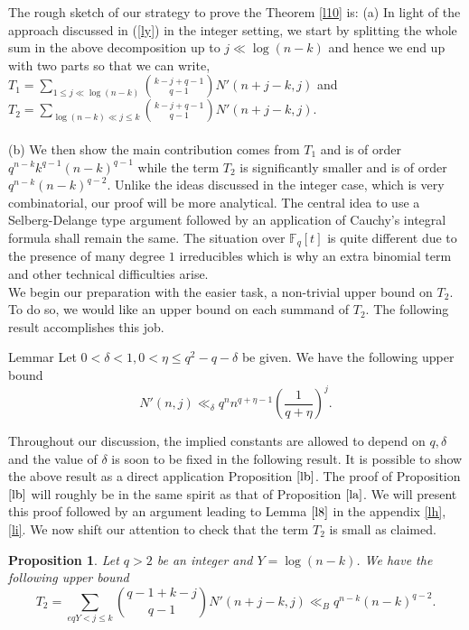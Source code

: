 \documentclass[12pt]{amsart}
\numberwithin{equation}{section}
\newtheorem{prop}[theorem]{Proposition}
\theoremstyle{remark}
\theoremstyle{remark}
\theoremstyle{definition}
\begin{document}
The rough sketch of our strategy to prove the Theorem \ref{l10} is:
(a) In light of the approach discussed in (\ref{ly}) in the integer setting, we start by splitting the whole sum in the above decomposition up to $j\ll \log(n-k)$ and hence we end up with two parts  so that we can write, $T_1={\sum_{1\leqslant j\ll \log(n-k)}\binom{k-j+q-1}{q-1}N'(n+j-k,j)}$ and $T_2={\sum_{\log(n-k)\ll j\leqslant k}\binom{k-j+q-1}{q-1}N'(n+j-k,j)}$.\\\\
(b) We then show the main contribution comes from $T_1$ and is of order $q^{n-k}k^{q-1}(n-k)^{q-1}$ while the term $T_2$ is significantly smaller and is of order $q^{n-k}(n-k)^{q-2}$. Unlike the ideas discussed in the integer case, which is very combinatorial, our proof will be more analytical. The central idea to use a Selberg-Delange type argument followed by an application of Cauchy's integral formula shall remain the same. The situation over $\mathbb{F}_q[t]$ is quite different due to the presence of many degree $1$ irreducibles which is why an extra binomial term and other technical difficulties arise.\\
We begin our preparation with the easier task, a non-trivial upper bound on $T_2$. To do so, we would like an upper bound on each summand of $T_2$. The following result accomplishes this job. 
\begin{restatable}{Lemma}{r}\label{l8}
Let $0<\delta<1, 0<\eta\leqslant q^2-q-\delta$ be given. We have the following upper bound
$$N'(n,j)\ll_{\delta} q^n n^{q+\eta-1}\left(\dfrac{1}{q+\eta}\right)^j.$$
\end{restatable}
Throughout our discussion, the implied constants are allowed to depend on $q, \delta$ and the value of $\delta$ is soon to be fixed in the following result. It is possible to show the above result as a direct application Proposition $\ref{lb}$. The proof of Proposition $\ref{lb}$ will roughly be in the same spirit as that of Proposition $\ref{la}$. We will present this proof followed by an argument leading to Lemma $\ref{l8}$ in the appendix \ref{lh}, \ref{li}. We now shift our attention to check that the term $T_2$ is small as claimed.
\begin{prop}\label{l9}
Let $q>2$ be an integer and $Y=\log(n-k)$. We have the following upper bound 
$$T_2=\displaystyle\sum\limits_{eqY<j\leqslant k} \binom{q-1+k-j}{q-1}N'(n+j-k,j)\ll_{B} q^{n-k} (n-k)^{q-2}.$$
\end{prop}
\end{document}
